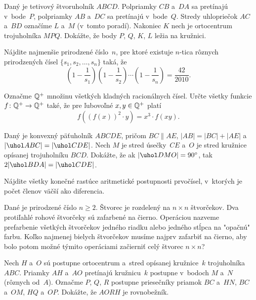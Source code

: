 {%
Daný je tetivový štvoruholník $ABCD$.
Polpriamky $CB$ a~$DA$ sa pretínajú v~bode~$P$, polpriamky $AB$ a~$DC$ sa pretínajú v~bode~$Q$.
Stredy uhlopriečok $AC$ a~$BD$ označíme $L$ a~$M$ (v~tomto poradí).
Nakoniec $K$ nech je ortocentrum trojuholníka $MPQ$.
Dokážte, že body $P$, $Q$, $K$, $L$ ležia na kružnici.}

{%
Nájdite najmenšie prirodzené číslo~$n$, pre ktoré existuje $n$-tica rôznych prirodzených čísel $\{s_1,s_2,\dots,s_n\}$ taká, že
$$
\left(1-\frac{1}{s_1}\right)
\left(1-\frac{1}{s_2}\right)
\cdots
\left(1-\frac{1}{s_n}\right)
=\frac{42}{2010}.
$$
}

{%
Označme $\Bbb Q^+$ množinu všetkých kladných racionálnych čísel.
Určte všetky funkcie $f\colon\Bbb Q^{+}\to \Bbb Q^{+}$ také, že pre ľubovoľné
$x,y\in \Bbb Q^{+}$ platí
$$
f\left((f(x))^2\cdot y\right)=x^3\cdot f(xy).
$$
}

{%
Daný je konvexný päťuholník $ABCDE$, pričom $BC\parallel AE$, $|AB|=|BC|+|AE|$ a~$|\uhol ABC|=|\uhol CDE|$. Nech $M$ je stred úsečky~$CE$ a~$O$ je stred kružnice opísanej trojuholníku $BCD$. Dokážte, že ak $|\uhol DMO|=90^{\circ}$, tak $2|\uhol BDA|=|\uhol CDE|$.
}

{%
Nájdite všetky konečné rastúce aritmetické postupnosti prvočísel, v~ktorých je počet členov väčší ako diferencia.}

{%
Dané je prirodzené číslo $n\ge 2$. Štvorec je rozdelený na $n\times n$ štvorčekov. Dva protiľahlé rohové štvorčeky sú zafarbené na čierno. Operáciou nazveme prefarbenie všetkých štvorčekov jedného riadku alebo jedného stĺpca na "opačnú" farbu. Koľko najmenej bielych štvorčekov musíme najprv zafarbiť na čierno, aby bolo potom možné týmito operáciami začierniť celý štvorec $n\times n$?}

{%
Nech $H$ a~$O$ sú postupne ortocentrum a~stred opísanej kružnice~$k$ trojuholníka $ABC$. Priamky $AH$ a~$AO$ pretínajú kružnicu~$k$ postupne v~bodoch $M$ a~$N$ (rôznych od~$A$). Označme $P$, $Q$, $R$ postupne priesečníky priamok $BC$ a~$HN$, $BC$ a~$OM$, $HQ$ a~$OP$. Dokážte, že $AORH$ je rovnobežník.}


